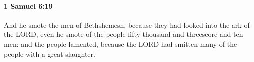 
		\paragraph{1 Samuel 6:19} %
			\label{1SAMUEL-6-19}

			And he smote the men of Bethshemesh, because they had looked into the ark of the LORD, even he smote of the people fifty thousand and threescore and ten men: and the people lamented, because the LORD had smitten many of the people with a great slaughter.


